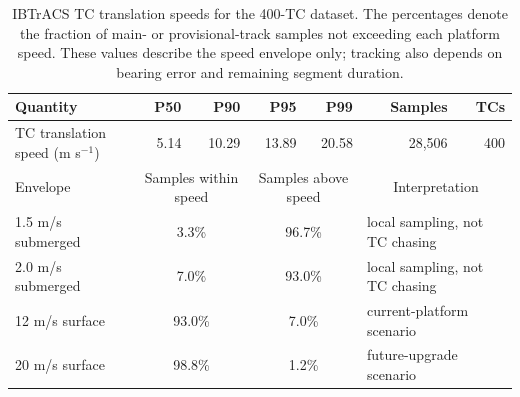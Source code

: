 \begin{table}[t]
\centering
\caption{IBTrACS TC translation speeds for the 400-TC dataset.
The percentages denote the fraction of main- or provisional-track samples not exceeding
each platform speed. These values describe the speed envelope only;
tracking also depends on bearing error and remaining segment duration.}
\label{tab:tc_speed_envelope}
\small
\begin{tabular}{@{}lrrrrrr@{}}
\toprule
Quantity & P50 & P90 & P95 & P99 & Samples & TCs \\
\midrule
TC translation speed (m s$^{-1}$) & 5.14 & 10.29 & 13.89 & 20.58 & 28,506 & 400 \\
\midrule
Envelope & \multicolumn{2}{c}{Samples within speed} & \multicolumn{2}{c}{Samples above speed} & \multicolumn{2}{c}{Interpretation} \\
1.5 m/s submerged & \multicolumn{2}{c}{3.3\%} & \multicolumn{2}{c}{96.7\%} & \multicolumn{2}{l}{local sampling, not TC chasing} \\
2.0 m/s submerged & \multicolumn{2}{c}{7.0\%} & \multicolumn{2}{c}{93.0\%} & \multicolumn{2}{l}{local sampling, not TC chasing} \\
12 m/s surface & \multicolumn{2}{c}{93.0\%} & \multicolumn{2}{c}{7.0\%} & \multicolumn{2}{l}{current-platform scenario} \\
20 m/s surface & \multicolumn{2}{c}{98.8\%} & \multicolumn{2}{c}{1.2\%} & \multicolumn{2}{l}{future-upgrade scenario} \\
\bottomrule
\end{tabular}
\end{table}
